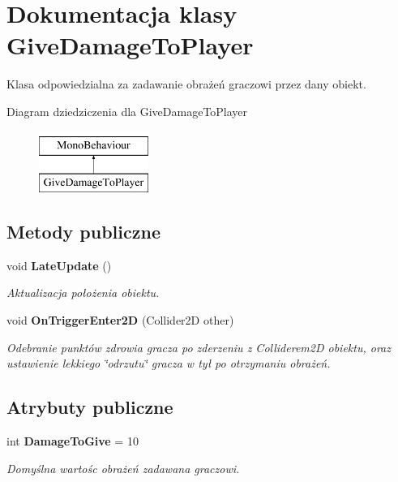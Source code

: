 \section{Dokumentacja klasy Give\+Damage\+To\+Player}
\label{class_give_damage_to_player}


Klasa odpowiedzialna za zadawanie obrażeń graczowi przez dany obiekt.  


Diagram dziedziczenia dla Give\+Damage\+To\+Player\begin{figure}[H]
\begin{center}
\leavevmode
\includegraphics[height=2.000000cm]{class_give_damage_to_player}
\end{center}
\end{figure}
\subsection*{Metody publiczne}
\begin{DoxyCompactItemize}
\item 
void {\bf Late\+Update} ()
\begin{DoxyCompactList}\small\item\em Aktualizacja położenia obiektu. \end{DoxyCompactList}\item 
void {\bf On\+Trigger\+Enter2\+D} (Collider2\+D other)
\begin{DoxyCompactList}\small\item\em Odebranie punktów zdrowia gracza po zderzeniu z Colliderem2\+D obiektu, oraz ustawienie lekkiego \char`\"{}odrzutu\char`\"{} gracza w tył po otrzymaniu obrażeń. \end{DoxyCompactList}\end{DoxyCompactItemize}
\subsection*{Atrybuty publiczne}
\begin{DoxyCompactItemize}
\item 
int {\bf Damage\+To\+Give} = 10
\begin{DoxyCompactList}\small\item\em Domyślna wartośc obrażeń zadawana graczowi. \end{DoxyCompactList}\end{DoxyCompactItemize}


